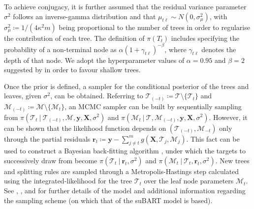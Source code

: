 \documentclass[aoas,preprint]{imsart}
\newcommand\given[1][]{\:#1\vert\:}
\theoremstyle{plain}
\theoremstyle{definition}
\theoremstyle{remark}
\begin{document}
To achieve conjugacy, it is further assumed that the residual variance parameter $\sigma^{2}$ follows an inverse-gamma distribution and that $\mu_{t\ell} \sim N(0,\sigma_{\mu}^{2})$, with $\sigma_{\mu}^{2} \coloneqq 1/(4\kappa^{2}m)$ being proportional to the number of trees in order to regularise the contribution of each tree. The definition of $\pi(T_{t})$ includes specifying the probability of a non-terminal node as $\alpha (1+\gamma_{t\ell})^{-\beta}$, where $\gamma_{t\ell}$ denotes the depth of that node. We adopt the hyperparameter values of $\alpha=0.95$ and $\beta=2$ suggested by \citet{chipman2010bart} in order to favour shallow trees.

Once the prior is defined, a sampler for the conditional posterior of the trees and leaves, given $\sigma^2$, can be obtained. Referring to $\boldsymbol{\mathcal{T}}_{(-t)} \coloneqq \boldsymbol{\mathcal{T}} \setminus \{\mathcal{T}_{t}\}$ and $\boldsymbol{\mathcal{M}}_{(-t)} \coloneqq \boldsymbol{\mathcal{M}} \setminus \{\mathcal{M}_{t}\}$, an MCMC sampler can be built by sequentially sampling from $\pi(\mathcal{T}_{t} \given \boldsymbol{\mathcal{T}}_{(-t)},\boldsymbol{\mathcal{M}},\mathbf{y},\mathbf{X},\sigma^{2})$ and $\pi(\mathcal{M}_{t} \given \boldsymbol{\mathcal{T}}, \boldsymbol{\mathcal{M}}_{(-t)}, \mathbf{y}, \mathbf{X}, \sigma^{2})$. However, it can be shown that the likelihood function depends on $(\boldsymbol{\mathcal{T}}_{(-t)},\mathcal{M}_{-t})$ only through the partial residuals $\mathbf{r}_{t} \coloneqq \mathbf{y} - \sum_{j\neq t}^{m}g(\mathbf{X},\mathcal{T}_{j},\mathcal{M}_{j})$. This fact can be used to construct a Bayesian back-fitting algorithm \citep{hastie2000bayesian}, under which the targets to successively draw from become $\pi(\mathcal{T}_{t}\given\mathbf{r}_{t},\sigma
^{2})$ and $\pi(\mathcal{M}_{t}\given\mathcal{T}_{t},
\mathbf{r}_{t}, \sigma ^{2})$. New trees and splitting rules are sampled through a Metropolis-Hastings step calculated using the integrated-likelihood for the tree $\mathcal{T}_{t}$ over the leaf node parameters $\mathcal{M}_{t}$. See \citet{chipman2010bart}, \citet{kapelner2016bartmachine}, and \citet{tan2019bayesian} for further details of the model and additional information regarding the sampling scheme (on which that of the suBART model is based).
\end{document}
